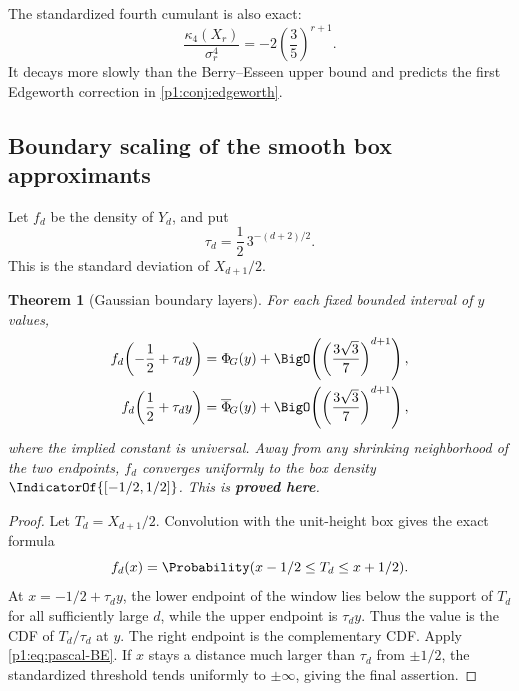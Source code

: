 \documentclass[11pt,oneside]{article}
\numberwithin{equation}{section}
\newtheorem{theorem}{Theorem}[section]
\theoremstyle{definition}
\theoremstyle{remark}
\newcommand{\statusproved}{\textcolor{deepgreen}{\textbf{proved here}}}
\newcommand{\NormalCDF}{\Phi_{\!G}}
\newcommand{\NormalSurv}{\overline{\Phi}_{\!G}}
\begin{document}
\begin{remark}
The standardized fourth cumulant is also exact:
\begin{equation}
 \frac{\kappa_4(X_r)}{\sigma_r^4}
 =-2\left(\frac35\right)^{r+1}.
 \label{p1:eq:pascal-standardized-k4}
\end{equation}
It decays more slowly than the Berry--Esseen upper bound and predicts the first Edgeworth
correction in \cref{p1:conj:edgeworth}.
\end{remark}

\subsection{Boundary scaling of the smooth box approximants}

Let $f_d$ be the density of $Y_d$, and put
\begin{equation}
 \tau_d=\frac12\,3^{-(d+2)/2}.
 \label{p1:eq:tau-d}
\end{equation}
This is the standard deviation of $X_{d+1}/2$.

\begin{theorem}[Gaussian boundary layers]
\label{p1:thm:boundary-layer}
For each fixed bounded interval of $y$ values,
\begin{align}
 f_d\!\left(-\frac12+\tau_dy\right)
 &=\NormalCDF(y)+
   \BigO\!\left(\left(\frac{3\sqrt3}{7}\right)^{d+1}\right),
 \label{p1:eq:left-boundary}\\
 f_d\!\left(\frac12+\tau_dy\right)
 &=\NormalSurv(y)+
   \BigO\!\left(\left(\frac{3\sqrt3}{7}\right)^{d+1}\right),
 \label{p1:eq:right-boundary}
\end{align}
where the implied constant is universal.  Away from any shrinking neighborhood of the two
endpoints, $f_d$ converges uniformly to the box density
$\IndicatorOf{[-1/2,1/2]}$.  This is \statusproved.
\end{theorem}

\begin{proof}
Let $T_d=X_{d+1}/2$.  Convolution with the unit-height box gives the exact formula
\begin{equation}
 f_d(x)=\Probability(x-1/2\le T_d\le x+1/2).
 \label{p1:eq:fd-window}
\end{equation}
At $x=-1/2+\tau_dy$, the lower endpoint of the window lies below the support of $T_d$ for
all sufficiently large $d$, while the upper endpoint is $\tau_dy$.  Thus the value is the
CDF of $T_d/\tau_d$ at $y$.  The right endpoint is the complementary CDF.  Apply
\eqref{p1:eq:pascal-BE}.  If $x$ stays a distance much larger than $\tau_d$ from
$\pm1/2$, the standardized threshold tends uniformly to $\pm\infty$, giving the final
assertion.
\end{proof}
\end{document}
